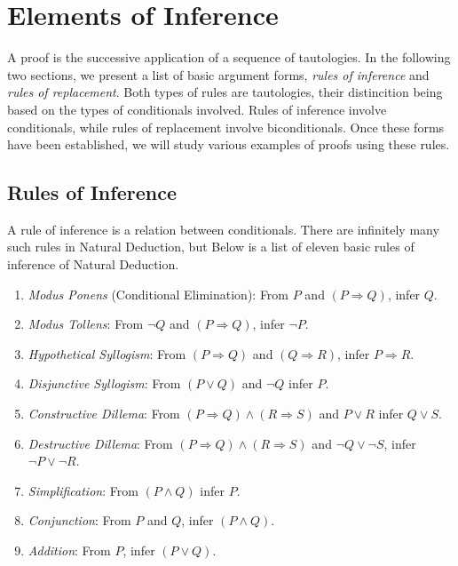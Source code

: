 \chapter{Elements of Inference}

A proof is the successive application of a sequence of tautologies. In the following two sections, we present a list of basic argument forms, \textit{rules of inference} and \textit{rules of replacement}. Both types of rules are tautologies, their distincition being based on the types of conditionals involved. Rules of inference involve conditionals, while rules of replacement involve biconditionals. Once these forms have been established, we will study various examples of proofs using these rules. 

\section{Rules of Inference}
A rule of inference is a relation between conditionals. There are infinitely many such rules in Natural Deduction, but 
Below is a list of eleven basic rules of inference of Natural Deduction. 

\begin{enumerate}
\item \textit{Modus Ponens} (Conditional Elimination): From $P$ and $(P \Rightarrow Q)$, infer $Q$.
\item \textit{Modus Tollens}: From $\neg Q$ and $(P \Rightarrow Q)$, infer $\neg P$. 
\item \textit{Hypothetical Syllogism}: From $(P \Rightarrow Q)$ and $(Q \Rightarrow R)$, infer $P \Rightarrow R$. 
\item \textit{Disjunctive Syllogism}: From $(P \lor Q)$ and $\neg Q$ infer $P$. 
\item \textit{Constructive Dillema}: From $(P \Rightarrow Q) \land (R \Rightarrow S)$ and  $P \lor R$ infer  $Q \lor S$. 
\item \textit{Destructive Dillema}: From $(P \Rightarrow Q) \land (R \Rightarrow S)$ and $\neg Q \lor \neg S$, infer $\neg P \lor \neg R$. 
\item \textit{Simplification}: From $(P \land Q)$ infer $P$. 
\item \textit{Conjunction}: From $P$ and $Q$, infer $(P \land Q)$. 
\item \textit{Addition}: From $P$, infer $(P \lor Q)$. 
\end{enumerate}

